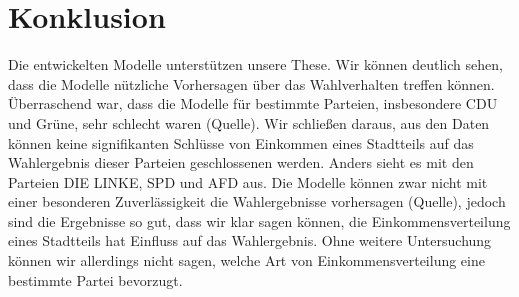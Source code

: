 \documentclass[a4paper,10pt]{scrartcl}
\begin{document}
\section{Konklusion}
Die entwickelten Modelle unterstützen unsere These. Wir können deutlich sehen, dass die Modelle nützliche Vorhersagen über das Wahlverhalten treffen können. Überraschend war, dass die Modelle für bestimmte Parteien, insbesondere CDU und Grüne, sehr schlecht waren (Quelle). Wir schließen daraus, aus den Daten können keine signifikanten Schlüsse von Einkommen eines Stadtteils auf das Wahlergebnis dieser Parteien geschlossenen werden. Anders sieht es mit den Parteien DIE LINKE, SPD und AFD aus. Die Modelle können zwar nicht mit einer besonderen Zuverlässigkeit die Wahlergebnisse vorhersagen (Quelle), jedoch sind die Ergebnisse so gut, dass wir klar sagen können, die Einkommensverteilung eines Stadtteils hat Einfluss auf das Wahlergebnis. Ohne weitere Untersuchung können wir allerdings nicht sagen, welche Art von Einkommensverteilung eine bestimmte Partei bevorzugt. 
\end{document}
